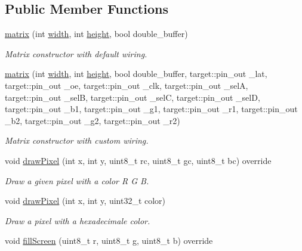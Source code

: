 \subsection*{Public Member Functions}
\begin{DoxyCompactItemize}
\item 
\hyperlink{classmatrix_a4e54abccfd55d40a3caebb47b1bf96a0}{matrix} (int \hyperlink{class_screen_a49be8f8ccf7ed7a3151a761495c0ce21}{width}, int \hyperlink{class_screen_a55405920693276db8fbdbf3a903b8d2f}{height}, bool double\+\_\+buffer)
\begin{DoxyCompactList}\small\item\em Matrix constructor with default wiring. \end{DoxyCompactList}\item 
\hyperlink{classmatrix_a29a4203237fd9480a42b435fb504b2b5}{matrix} (int \hyperlink{class_screen_a49be8f8ccf7ed7a3151a761495c0ce21}{width}, int \hyperlink{class_screen_a55405920693276db8fbdbf3a903b8d2f}{height}, bool double\+\_\+buffer, target\+::pin\+\_\+out \+\_\+lat, target\+::pin\+\_\+out \+\_\+oe, target\+::pin\+\_\+out \+\_\+clk, target\+::pin\+\_\+out \+\_\+selA, target\+::pin\+\_\+out \+\_\+selB, target\+::pin\+\_\+out \+\_\+selC, target\+::pin\+\_\+out \+\_\+selD, target\+::pin\+\_\+out \+\_\+b1, target\+::pin\+\_\+out \+\_\+g1, target\+::pin\+\_\+out \+\_\+r1, target\+::pin\+\_\+out \+\_\+b2, target\+::pin\+\_\+out \+\_\+g2, target\+::pin\+\_\+out \+\_\+r2)
\begin{DoxyCompactList}\small\item\em Matrix constructor with custom wiring. \end{DoxyCompactList}\item 
void \hyperlink{classmatrix_a9e12daa9f177f70cecfeae60770eb59a}{draw\+Pixel} (int x, int y, uint8\+\_\+t rc, uint8\+\_\+t gc, uint8\+\_\+t bc) override
\begin{DoxyCompactList}\small\item\em Draw a given pixel with a color R G B. \end{DoxyCompactList}\item 
void \hyperlink{classmatrix_a505fdd2958c4be8cf2ceaf19873358f9}{draw\+Pixel} (int x, int y, uint32\+\_\+t color)
\begin{DoxyCompactList}\small\item\em Draw a pixel with a hexadecimale color. \end{DoxyCompactList}\item 
void \hyperlink{classmatrix_afbb1e0fe6c1ad426879c5019b39f896e}{fill\+Screen} (uint8\+\_\+t r, uint8\+\_\+t g, uint8\+\_\+t b) override

\end{DoxyCompactItemize}
